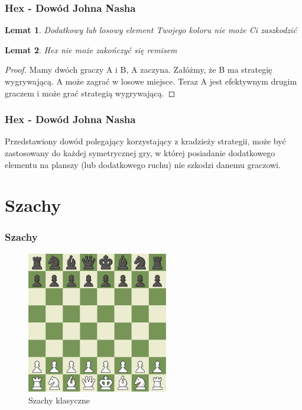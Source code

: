 \documentclass[polish,envcountsect,10pt]{beamer}
\newtheorem{lmt}{Lemat}
\begin{document}
                \begin{frame}
                    \frametitle{Hex - Dowód Johna Nasha}
                    \begin{lmt}
                        Dodatkowy lub losowy element Twojego koloru nie może Ci zaszkodzić
                    \end{lmt} \pause
                    \begin{lmt}
                        Hex nie może zakończyć się remisem
                    \end{lmt} \pause
                    \begin{proof}
                        Mamy dwóch graczy A i B, A zaczyna. Załóżmy, że B ma strategię wygrywającą. A może zagrać w losowe miejsce. Teraz A jest efektywnym drugim graczem i może grać strategią wygrywającą.
                    \end{proof}
                \end{frame}
                \begin{frame}
                    \frametitle{Hex - Dowód Johna Nasha}
                    Przedstawiony dowód polegający korzystający z kradzieży strategii, może być zastosowany do każdej symetrycznej gry, w której posiadanie dodatkowego elementu na planszy (lub dodatkowego ruchu) nie szkodzi danemu graczowi.
                \end{frame} 
    \section{Szachy}
        \begin{frame}
            \frametitle{Szachy}
            \begin{figure}[]
                \centering
                \includegraphics[width=0.55\textwidth]{images/chess.png}
                \caption{Szachy klasyczne}
            \end{figure}
        \end{frame}
\end{document}
